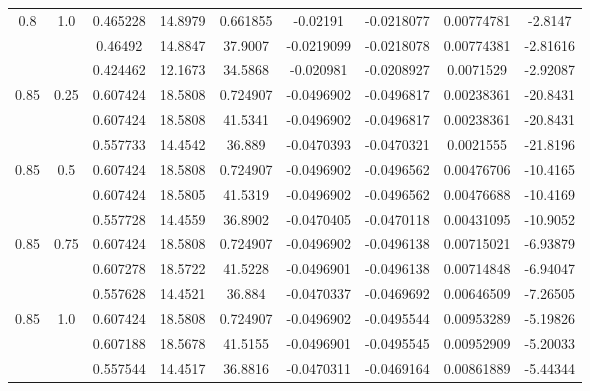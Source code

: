 \documentclass[11pt]{article}
\begin{document}
\begin{figure}[h]
\begin{tabular}{|c|c|c|c|c|c|c|c|c|}
\multirow{3}{*}{0.8} & \multirow{3}{*}{1.0} & 0.465228 & 14.8979 & 0.661855 & -0.02191 & -0.0218077 & 0.00774781 & -2.8147\\\cline{3-9}
 &  & 0.46492 & 14.8847 & 37.9007 & -0.0219099 & -0.0218078 & 0.00774381 & -2.81616\\\cline{3-9}
 &  & 0.424462 & 12.1673 & 34.5868 & -0.020981 & -0.0208927 & 0.0071529 & -2.92087\\\hline
\multirow{3}{*}{0.85} & \multirow{3}{*}{0.25} & 0.607424 & 18.5808 & 0.724907 & -0.0496902 & -0.0496817 & 0.00238361 & -20.8431\\\cline{3-9}
 &  & 0.607424 & 18.5808 & 41.5341 & -0.0496902 & -0.0496817 & 0.00238361 & -20.8431\\\cline{3-9}
 &  & 0.557733 & 14.4542 & 36.889 & -0.0470393 & -0.0470321 & 0.0021555 & -21.8196\\\hline
\multirow{3}{*}{0.85} & \multirow{3}{*}{0.5} & 0.607424 & 18.5808 & 0.724907 & -0.0496902 & -0.0496562 & 0.00476706 & -10.4165\\\cline{3-9}
 &  & 0.607424 & 18.5805 & 41.5319 & -0.0496902 & -0.0496562 & 0.00476688 & -10.4169\\\cline{3-9}
 &  & 0.557728 & 14.4559 & 36.8902 & -0.0470405 & -0.0470118 & 0.00431095 & -10.9052\\\hline
\multirow{3}{*}{0.85} & \multirow{3}{*}{0.75} & 0.607424 & 18.5808 & 0.724907 & -0.0496902 & -0.0496138 & 0.00715021 & -6.93879\\\cline{3-9}
 &  & 0.607278 & 18.5722 & 41.5228 & -0.0496901 & -0.0496138 & 0.00714848 & -6.94047\\\cline{3-9}
 &  & 0.557628 & 14.4521 & 36.884 & -0.0470337 & -0.0469692 & 0.00646509 & -7.26505\\\hline
\multirow{3}{*}{0.85} & \multirow{3}{*}{1.0} & 0.607424 & 18.5808 & 0.724907 & -0.0496902 & -0.0495544 & 0.00953289 & -5.19826\\\cline{3-9}
 &  & 0.607188 & 18.5678 & 41.5155 & -0.0496901 & -0.0495545 & 0.00952909 & -5.20033\\\cline{3-9}
 &  & 0.557544 & 14.4517 & 36.8816 & -0.0470311 & -0.0469164 & 0.00861889 & -5.44344\\\hline

\end{tabular}
\end{figure}
\end{document}
